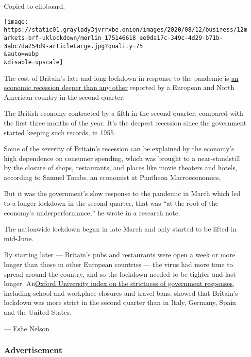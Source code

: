 Copied to clipboard.

\texttt{[image: https://static01.graylady3jvrrxbe.onion/images/2020/08/12/business/12markets-brf-uklockdown/merlin\_175146618\_ee0da17c-349c-4d29-b71b-3abc7da254d9-articleLarge.jpg?quality=75\\\&auto=webp\\\&disable=upscale]}

The cost of Britain's late and long lockdown in response to the pandemic
is
\href{https://www.nytimes3xbfgragh.onion/live/2020/08/12/business/stock-market-today-coronavirus\#britains-lockdown-recession-is-the-deepest-in-europe-and-north-america}{an
economic recession deeper than any other} reported by a European and
North American country in the second quarter.

The British economy contracted by a fifth in the second quarter,
compared with the first three months of the year. It's the deepest
recession since the government started keeping such records, in 1955.

Some of the severity of Britain's recession can be explained by the
economy's high dependence on consumer spending, which was brought to a
near-standstill by the closure of shops, restaurants, and places like
movie theaters and hotels, according to Samuel Tombs, an economist at
Pantheon Macroeconomics.

But it was the government's slow response to the pandemic in March which
led to a longer lockdown in the second quarter, that was ``at the root
of the economy's underperformance,'' he wrote in a research note.

The nationwide lockdown began in late March and only started to be
lifted in mid-June.

By starting later --- Britain's pubs and restaurants were open a week or
more longer than those in other European countries --- the virus had
more time to spread around the country, and so the lockdown needed to be
tighter and last longer.
An\href{https://www.bsg.ox.ac.uk/research/research-projects/coronavirus-government-response-tracker}{Oxford
University index on the strictness of government responses}, including
school and workplace closures and travel bans, showed that Britain's
lockdown was more strict in the second quarter than in Italy, Germany,
Spain and the United States.

--- \href{https://www.nytimes3xbfgragh.onion/by/eshe-nelson}{Eshe
Nelson}

\hypertarget{advertisement-2}{%
\subsubsection{Advertisement}\label{advertisement-2}}

